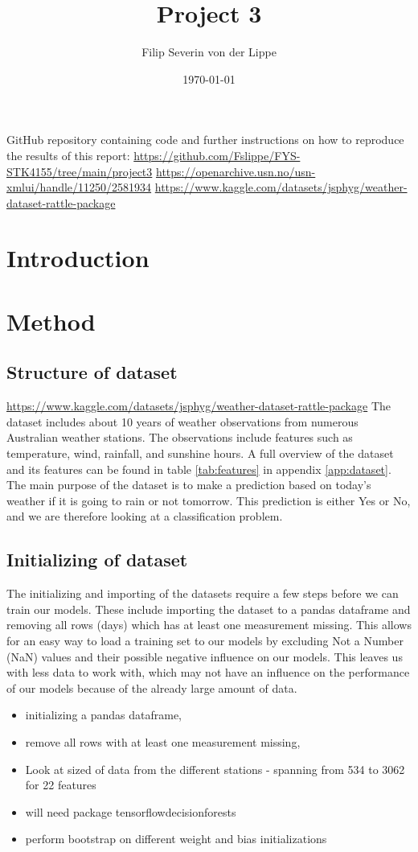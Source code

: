 \documentclass[11pt]{article}
\title{Project 3\\ }
\author{Filip Severin von der Lippe}
\date{\today}
\begin{document}
\maketitle
GitHub repository containing code and further instructions on how to reproduce the results of this report: \url{https://github.com/Fslippe/FYS-STK4155/tree/main/project3}
\url{https://openarchive.usn.no/usn-xmlui/handle/11250/2581934}
\url{https://www.kaggle.com/datasets/jsphyg/weather-dataset-rattle-package}
\begin{abstract}
\end{abstract}
\newpage
\tableofcontents
\newpage
\section{Introduction}
\section{Method}
\subsection{Structure of dataset} %
\label{sub:Structure of dataset}
\url{https://www.kaggle.com/datasets/jsphyg/weather-dataset-rattle-package}
The dataset includes about 10 years of weather observations from numerous Australian weather stations. The observations include features such as temperature, wind, rainfall, and sunshine hours. A full overview of the dataset and its features can be found in table \ref{tab:features} in appendix \ref{app:dataset}. The main purpose of the dataset is to make a prediction based on today's weather if it is going to rain or not tomorrow. This prediction is either Yes or No, and we are therefore looking at a classification problem.

\subsection{Initializing of dataset}
The initializing and importing of the datasets require a few steps before we can train our models. These include importing the dataset to a pandas dataframe and removing all rows (days) which has at least one measurement missing. This allows for an easy way to load a training set to our models by excluding Not a Number (NaN) values and their possible negative influence on our models. This leaves us with less data to work with, which may not have an influence on the performance of our models because of the already large amount of data.
\begin{itemize}
    \item initializing a pandas dataframe,
    \item remove all rows with at least one measurement missing,
    \item Look at sized of data from the different stations - spanning from 534 to 3062 for 22 features
    \item will need package tensorflowdecisionforests
    \item perform bootstrap on different weight and bias initializations
\end{itemize}
\end{document}
